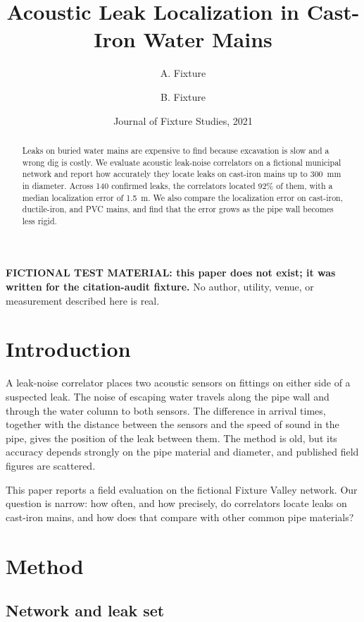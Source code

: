 \documentclass{article}
\title{Acoustic Leak Localization in Cast-Iron Water Mains}
\author{A. Fixture \and B. Fixture}
\date{Journal of Fixture Studies, 2021}
\begin{document}
\maketitle

\noindent\textbf{FICTIONAL TEST MATERIAL: this paper does not exist; it was
written for the citation-audit fixture.} No author, utility, venue, or
measurement described here is real.

\begin{abstract}
Leaks on buried water mains are expensive to find because excavation is slow
and a wrong dig is costly. We evaluate acoustic leak-noise correlators on a
fictional municipal network and report how accurately they locate leaks on
cast-iron mains up to 300~mm in diameter. Across 140 confirmed leaks, the
correlators located 92\% of them, with a median localization error of 1.5~m.
We also compare the localization error on cast-iron, ductile-iron, and PVC
mains, and find that the error grows as the pipe wall becomes less rigid.
\end{abstract}

\section{Introduction}
\label{sec:introduction}

A leak-noise correlator places two acoustic sensors on fittings on either side
of a suspected leak. The noise of escaping water travels along the pipe wall
and through the water column to both sensors. The difference in arrival times,
together with the distance between the sensors and the speed of sound in the
pipe, gives the position of the leak between them. The method is old, but its
accuracy depends strongly on the pipe material and diameter, and published
field figures are scattered.

This paper reports a field evaluation on the fictional Fixture Valley network.
Our question is narrow: how often, and how precisely, do correlators locate
leaks on cast-iron mains, and how does that compare with other common pipe
materials?

\section{Method}
\label{sec:method}

\subsection{Network and leak set}
\label{sec:method-network}
\end{document}
